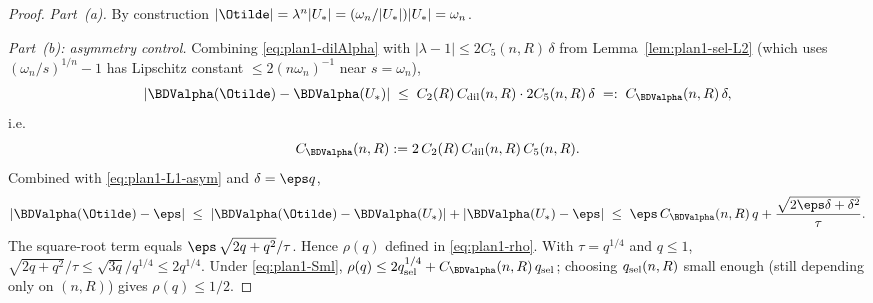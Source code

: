 \begin{proof}
\emph{Part~(a).} By construction
$|\Otilde|=\lambda^{n}|U_*|=(\omega_n/|U_*|)|U_*|=\omega_n$.

\emph{Part~(b): asymmetry control.} Combining
\eqref{eq:plan1-dilAlpha} with $|\lambda-1|\le 2C_5(n,R)\,\delta$ from
Lemma~\ref{lem:plan1-sel-L2} (which uses
$(\omega_n/s)^{1/n}-1$ has Lipschitz constant
$\le 2(n\omega_n)^{-1}$ near $s=\omega_n$),
\[
|\BDValpha(\Otilde)-\BDValpha(U_*)|
\;\le\;C_2(R)\,C_{\rm dil}(n,R)\cdot 2C_5(n,R)\,\delta
\;=:\;C_{\BDValpha}(n,R)\,\delta,
\]
i.e.\
\begin{equation}\label{eq:plan1-Calpha-def}
C_{\BDValpha}(n,R):=2\,C_2(R)\,C_{\rm dil}(n,R)\,C_5(n,R).
\end{equation}
Combined with \eqref{eq:plan1-L1-asym} and $\delta=\eps q$,
\[
|\BDValpha(\Otilde)-\eps|
\;\le\;|\BDValpha(\Otilde)-\BDValpha(U_*)|
+|\BDValpha(U_*)-\eps|
\;\le\;\eps\,C_{\BDValpha}(n,R)\,q
+\frac{\sqrt{2\eps\delta+\delta^2}}{\tau}.
\]
The square-root term equals
$\eps\,\sqrt{2q+q^{2}}/\tau$. Hence $\rho(q)$ defined in
\eqref{eq:plan1-rho}. With $\tau=q^{1/4}$ and $q\le1$,
$\sqrt{2q+q^{2}}/\tau\le \sqrt{3q}/q^{1/4}\le2q^{1/4}$. Under
\eqref{eq:plan1-Sml},
$\rho(q)\le 2 q_{\rm sel}^{1/4}+C_{\BDValpha}(n,R)\,q_{\rm sel}$;
choosing $q_{\rm sel}(n,R)$ small enough (still depending only on
$(n,R)$) gives $\rho(q)\le 1/2$.


\end{proof}
